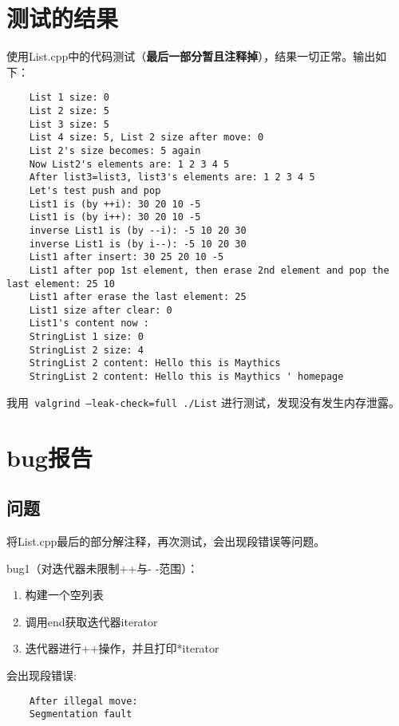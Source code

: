 \documentclass[UTF8]{ctexart}
\begin{document}
\section{测试的结果}

使用List.cpp中的代码测试（\textbf{最后一部分暂且注释掉}），结果一切正常。输出如下：

\begin{verbatim}
    List 1 size: 0
    List 2 size: 5
    List 3 size: 5
    List 4 size: 5, List 2 size after move: 0
    List 2's size becomes: 5 again
    Now List2's elements are: 1 2 3 4 5
    After list3=list3, list3's elements are: 1 2 3 4 5
    Let's test push and pop
    List1 is (by ++i): 30 20 10 -5
    List1 is (by i++): 30 20 10 -5
    inverse List1 is (by --i): -5 10 20 30
    inverse List1 is (by i--): -5 10 20 30
    List1 after insert: 30 25 20 10 -5
    List1 after pop 1st element, then erase 2nd element and pop the last element: 25 10
    List1 after erase the last element: 25
    List1 size after clear: 0
    List1's content now :
    StringList 1 size: 0
    StringList 2 size: 4
    StringList 2 content: Hello this is Maythics
    StringList 2 content: Hello this is Maythics ' homepage
\end{verbatim}

我用\texttt{ valgrind --leak-check=full  ./List} 进行测试，发现没有发生内存泄露。

\section{bug报告}

\subsection{问题}

将List.cpp最后的部分解注释，再次测试，会出现段错误等问题。\

bug1（对迭代器未限制++与- -范围）：\

\begin{enumerate}
    \item 构建一个空列表
    \item 调用end获取迭代器iterator
    \item 迭代器进行++操作，并且打印*iterator
\end{enumerate}

会出现段错误:
\begin{verbatim}
    After illegal move:
    Segmentation fault
\end{verbatim}
\end{document}
